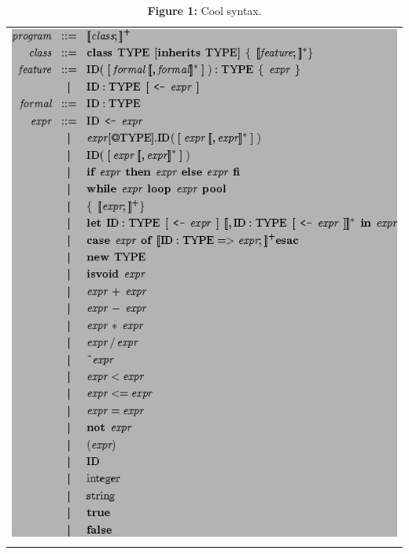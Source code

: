 \documentclass[]{article}
\begin{document}
\begin{longtable}[c]{@{}l@{}}
\hline\noalign{\medskip}
\includegraphics{img43.png}
\\\noalign{\medskip}
\hline
\noalign{\medskip}
\caption{\textbf{Figure 1:} Cool syntax.}
\end{longtable}
\end{document}
